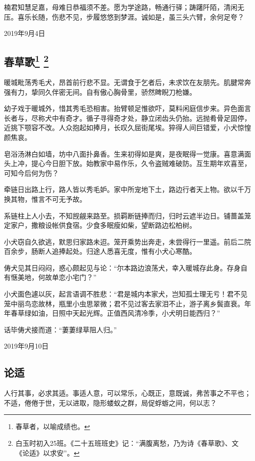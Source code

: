 \documentclass[a5paper]{ctexart}
\begin{document}
	楠君知慧足嘉，母难日恭福须不差。愿为学途路，畅通行驿；踌躇阡陌，清闲无压。喜乐长随，伤悲不见，步履悠悠到梦涯。诚如是，虽三头六臂，余何足夸？
	\begin{flushright}
		2019年9月4日
	\end{flushright}
	
	\subsection[春草歌]{春草歌\footnote{春草者，以喻成绩也。}  \footnote{白玉时初入25班。《二十五班班史》记：“满腹离愁，乃为诗《春草歌》、文《论适》以求安”。}}
	暖城毗荡秀毛犬，昂首前行悲不显。无谓食于乞者后，未求饮在友朋先。肌腱常奔强有力，挚同久伴密无间。自有傲心胸骨里，骄然睥睨刀枪嫌。
	
	幼子戏于暖城外，惜其秀毛恐相害。抬臂顿足惟欲吓，莫料闲庭信步来。异色面言长者与，尽称犬中有奇才。循子寻得奇才处，静立闭齿头仍抬。远抛肴骨足固停，近挑下颚容不改。人众抱起如捧月，长叹久屈街尾埃。猝得人间巨错爱，小犬惊惶颜焦哀。
	
	皂浴汤淋白如墙，坊中八面扑鼻香。生来初得如是爽，是夜眠得一觉康。喜意满面头上冲，提心今日胆下放。始教家中易作乐，久令盗贼难破防。互生期年欢喜至，可知今后何为伤？
	
	牵链日出路上行，路人皆以秀毛妒。家中所宠地下土，路边行者天上物。欲以千万换其物，惟言不可无予故。
	
	系链柱上人小去，不知觊觎来路至。损羁断链捧而归，归时云遮半边日。铺蔷盖笼定家户，撒粮设帐供食宿。少食多眠瘦如柴，望断路边松柏树。
	
	小犬窃自久欲逃，默思归家路未迢。笼开乘势出奔走，未尝得行一里遥。前后二院百余步，肠断人追捧起处。归途人悉喜无度，惟有小犬心寒酷。
	
	俦犬见其日闷闷，惑心颇起见与论：“尔本路边浪荡犬，幸入暖城存此身。存身自有惬美地，何故单恋小宅门？”
	
	小犬面色遽以灰，起言语调不胜悲：“君是城内本家犬，岂知孤士理无亏！君不见笼中丽鸟恋故林，瓶里小虫思翠微；君不见过客去家泪不止，游子离乡鬓直衰。年年春草绿如油，日照中天起光辉。正值西风清冷季，小犬明日能西归？”
	
	话毕俦犬接而道：“萋萋绿草阻人归。”
	\begin{flushright}
		2019年9月10日
	\end{flushright}
	
	\subsection{论适}
	人行其事，必求其适。事适人意，可以常乐，心既正，意既诚，弗苦事之不平也；不适，倦倦于世，无以进取，隐形蝼蚁之群，局促蜉蝣之间，何以志？
	
\end{document}
